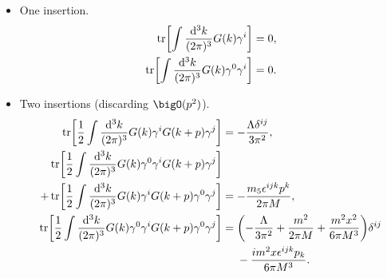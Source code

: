 \documentclass[letterpaper]{article}
\begin{document}
\begin{itemize}
    \item One insertion.
    \begin{align*}
        \tr[\int \frac{\dd[3]{k}}{(2\pi)^3} G(k) \gamma^i] &= 0, \\
        \tr[\int \frac{\dd[3]{k}}{(2\pi)^3} G(k) \gamma^0 \gamma^i] &= 0.
    \end{align*}
    \item Two insertions (discarding $\bigO(p^2)$).
    \begin{align*}
        \tr[\frac{1}{2} \int \frac{\dd[3]{k}}{(2\pi)^3} G(k) \gamma^i G(k+p)\gamma^j] &= -\frac{\Lambda\delta^{ij}}{3\pi^2}, \\
        \tr[\frac{1}{2} \int \frac{\dd[3]{k}}{(2\pi)^3} G(k) \gamma^0\gamma^i G(k+p)\gamma^j] \\
        + \tr[\frac{1}{2} \int \frac{\dd[3]{k}}{(2\pi)^3} G(k) \gamma^i G(k+p)\gamma^0\gamma^j] &= -\frac{m_5 \epsilon^{ijk} p^k}{2\pi M}, \\
        \tr[\frac{1}{2} \int \frac{\dd[3]{k}}{(2\pi)^3} G(k) \gamma^0\gamma^i G(k+p)\gamma^0\gamma^j] &= \qty(-\frac{\Lambda}{3\pi^2} + \frac{m^2}{2\pi M} + \frac{m^2 x^2}{6\pi M^3})\delta^{ij} \\
        &\phantom{{}={}} - \frac{i m^2 x \epsilon^{ijk}p_k}{6\pi M^3}.
    \end{align*}

\end{itemize}
\end{document}
